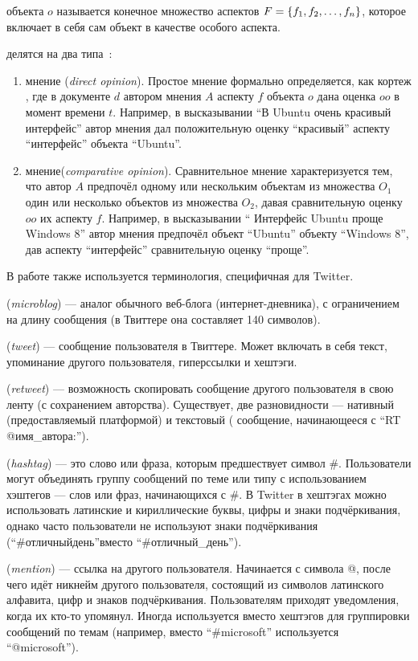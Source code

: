 { объекта} $o$ называется конечное множество аспектов 
$F = \left \{ f_1, f_2, \ldots , f_n \right \}$, которое включает в себя сам объект в качестве 
особого аспекта.

{} делятся на два типа~\cite{multi_faceted}:
\begin{enumerate}

\item{
  {} мнение (\textit{direct opinion}). Простое мнение формально 
  определяется, как кортеж , где в документе $d$ автором 
  мнения $A$ аспекту $f$ объекта $o$ дана оценка $oo$ в момент времени $t$. 
  Например, в высказывании ``В Ubuntu очень красивый интерфейс'' автор мнения 
  дал положительную оценку ``красивый'' аспекту ``интерфейс'' объекта ``Ubuntu''.
}

\item{
  {} мнение(\textit{comparative opinion}). Сравнительное мнение 
  характеризуется тем, что автор $A$ предпочёл одному или нескольким объектам 
  из множества $O_1$ один или несколько объектов из множества $O_2$, давая 
  сравнительную оценку $oo$ их аспекту $f$. Например, в высказывании ``
  Интерфейс Ubuntu проще Windows 8'' автор мнения предпочёл объект ``Ubuntu'' 
  объекту ``Windows 8'', дав аспекту ``интерфейс'' сравнительную оценку ``проще''. 
}

\end{enumerate}

В работе также используется терминология, специфичная для Twitter.

{} (\textit{microblog}) --- аналог обычного веб-блога 
(интернет-дневника), с ограничением на длину сообщения (в Твиттере она 
составляет 140 символов). 

{} (\textit{tweet}) --- сообщение пользователя в Твиттере. Может включать в 
себя текст, упоминание другого пользователя, гиперссылки и хештэги.

{} (\textit{retweet}) --- возможность скопировать сообщение другого 
пользователя в свою ленту (с сохранением авторства). Существует, две 
разновидности --- нативный (предоставляемый платформой) и текстовый (
сообщение, начинающееся с ``RT @имя\_автора:'').

{} (\textit{hashtag}) --- это слово или фраза, которым предшествует 
символ \#. Пользователи могут объединять группу сообщений по теме или типу с 
использованием хэштегов — слов или фраз, начинающихся с \#. В Twitter в 
хештэгах можно использовать латинские и кириллические буквы, цифры и знаки 
подчёркивания, однако часто пользователи не используют знаки подчёркивания (``\#отличныйдень''вместо ``\#отличный\_день'').

{} (\textit{mention}) --- ссылка на другого пользователя.  Начинается 
с символа @, после чего идёт никнейм другого пользователя, состоящий из 
символов латинского алфавита, цифр и знаков подчёркивания. Пользователям 
приходят уведомления, когда их кто-то упомянул. Иногда используется вместо 
хештэгов для группировки сообщений по темам (например, вместо ``\#microsoft'' 
используется ``@microsoft'').